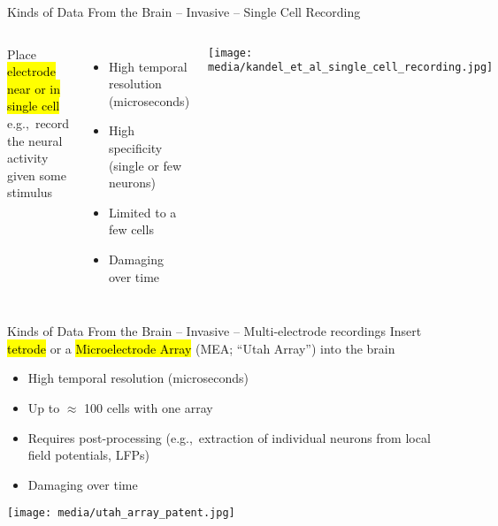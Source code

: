 \documentclass[handout,aspectratio=169]{beamer}
\begin{document}
\begin{frame}{Kinds of Data From the Brain -- Invasive -- Single Cell Recording}
	\vspace{0.5cm}
	\begin{columns}
		Place \hl{electrode near or in single cell}\\[0.125cm]
		e.g.,~record the neural activity given some stimulus\\[0.25cm]
		\begin{itemize}
			\setlength\itemsep{0.25cm}
			\item[\OPlus] High temporal resolution (microseconds)
			\item[\OPlus] High specificity (single or few neurons)
			\item[\OMinus] Limited to a few cells
			\item[\OMinus] Damaging over time
		\end{itemize}
		\texttt{[image: media/kandel\_et\_al\_single\_cell\_recording.jpg]}
	\end{columns}
	\vspace{0.5cm}
\end{frame}


\begin{frame}{Kinds of Data From the Brain -- Invasive -- Multi-electrode recordings}
	\vspace{0.5cm}
	Insert \hl{tetrode} or a \hl{Microelectrode Array} (MEA; \enquote{Utah Array}) into the brain\\[0.25cm]
	\begin{multicols}{2}
		\begin{itemize}
			\item[\OPlus] High temporal resolution (microseconds)
			\item[\OMeh] Up to $\approx$ 100 cells with one array
			\item[\OMeh] Requires post-processing (e.g.,~extraction of individual neurons from local field potentials, LFPs)
		\end{itemize}
		\columnbreak
		\begin{itemize}
			\item[\OMinus] Damaging over time
		\end{itemize}
		\centering
		\texttt{[image: media/utah\_array\_patent.jpg]}
	\end{multicols}
\end{frame}
\end{document}
